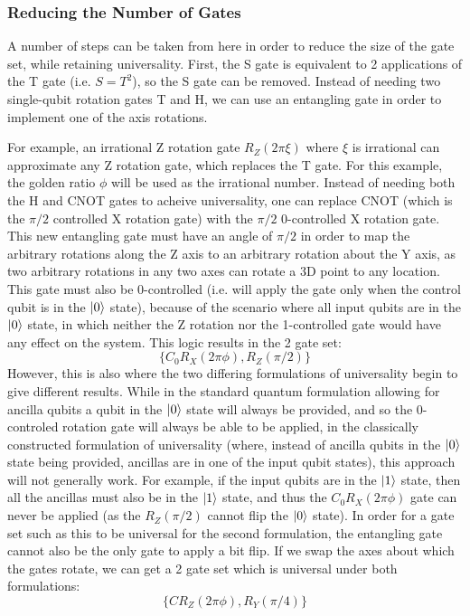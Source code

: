 \documentclass[12pt]{article}
\begin{document}
\subsubsection{Reducing the Number of Gates}
A number of steps can be taken from here in order to reduce the size of the gate set, while retaining universality. First, the S gate is equivalent to 2 applications of the T gate (i.e. $S = T^2$), so the S gate can be removed.
Instead of needing two single-qubit rotation gates T and H, we can use an entangling gate in order to implement one of the axis rotations.

For example, an irrational Z rotation gate $R_Z(2\pi\xi)$ where $\xi$ is irrational can approximate any Z rotation gate, which replaces the T gate. For this example, the golden ratio $\phi$ will be used as the irrational number. Instead of needing both the H and CNOT gates to acheive universality, one can replace CNOT (which is the $\pi / 2$ controlled X rotation gate) with the $\pi / 2$ 0-controlled X rotation gate.
This new entangling gate must have an angle of $\pi / 2$ in order to map the arbitrary rotations along the Z axis to an arbitrary rotation about the Y axis, as two arbitrary rotations in any two axes can rotate a 3D point to any location.
This gate must also be 0-controlled (i.e. will apply the gate only when the control qubit is in the $\ket{0}$ state), because of the scenario where all input qubits are in the $\ket{0}$ state, in which neither the Z rotation nor the 1-controlled gate would have any effect on the system.
This logic results in the 2 gate set:
$$\{C_0R_X(2\pi\phi), R_Z(\pi / 2)\}$$
However, this is also where the two differing formulations of universality begin to give different results. While in the standard quantum formulation allowing for ancilla qubits a qubit in the $\ket{0}$ state will always be provided, and so the 0-controled rotation gate will always be able to be applied, in the classically constructed formulation of universality (where, instead of ancilla qubits in the $\ket{0}$ state being provided, ancillas are in one of the input qubit states), this approach will not generally work. For example, if the input qubits are in the $\ket{1}$ state, then all the ancillas must also be in the $\ket{1}$ state, and thus the $C_0R_X(2\pi\phi)$ gate can never be applied (as the $R_Z(\pi / 2)$ cannot flip the $\ket{0}$ state). In order for a gate set such as this to be universal for the second formulation, the entangling gate cannot also be the only gate to apply a bit flip. If we swap the axes about which the gates rotate, we can get a 2 gate set which is universal under both formulations:
$$\{CR_Z(2\pi\phi), R_Y(\pi / 4)\}$$
\end{document}
